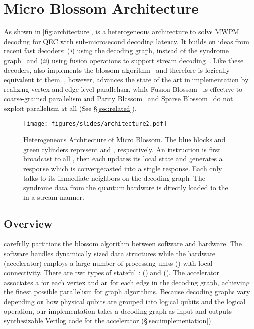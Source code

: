 \section{Micro Blossom Architecture}\label{sec:overview}

As shown in \autoref{fig:architecture}, \arch is a heterogeneous architecture to solve MWPM decoding for QEC with sub-microsecond decoding latency. 
It builds on ideas from recent fast decoders: (\textit{i}) using the decoding graph, instead of the syndrome graph~\cite{wu2023qce,higgott2025sparse} and (\textit{ii}) using fusion operations to support stream decoding~\cite{wu2023qce}.
Like these decoders, \arch also implements the blossom algorithm~\cite{edmonds1969blossom} and therefore is logically equivalent to them.
\arch, however, advances the state of the art in implementation by realizing vertex and edge level parallelism, while Fusion Blossom~\cite{wu2023qce} is effective to coarse-grained parallelism and Parity Blossom~\cite{wu2023qce} and Sparse Blossom~\cite{higgott2025sparse} do not exploit parallelism at all (See \S\ref{sec:related}). 

\begin{figure}[t]
    \centering
    \texttt{[image: figures/slides/architecture2.pdf]}
    \caption{Heterogeneous Architecture of Micro Blossom. The blue blocks and green cylinders represent \puvs and \pues, respectively.
    An instruction is first broadcast to all \pus, then each \pu updates its local state and generates a response which is convergecasted into a single response. Each \pu only talks to its immediate neighbors on the decoding graph.
    The syndrome data from the quantum hardware is directly loaded to the \puvs in a stream manner.
    }
    \label{fig:architecture}
\end{figure}

\subsection{Overview}

\arch carefully partitions the blossom algorithm between software and hardware.
The software handles dynamically sized data structures while the hardware (accelerator) employs a large number of processing units (\pus) with local connectivity.
There are two types of stateful \pus: \PUV (\puv) and \PUE (\pue).
The accelerator associates a \emph{\puv} for each vertex and an \emph{\pue} for each edge in the decoding graph, achieving the finest possible parallelism for graph algorithms. 
Because decoding graphs vary depending on how physical qubits are grouped into logical qubits and the logical operation, our implementation takes a decoding graph as input and outputs synthesizable Verilog code for the accelerator (\S\ref{sec:implementation}).

